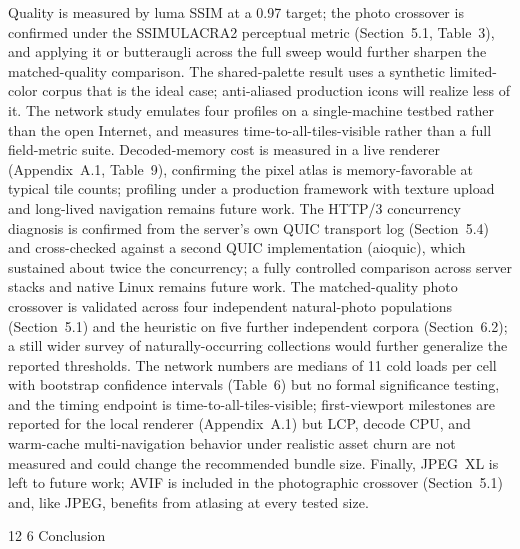 \documentclass[3p,twocolumn]{elsarticle}
\makeatletter
\renewcommand\section{\@startsection{section}{1}{\z@}%
           {12\p@ \@plus 3\p@ \@minus 4\p@}%
           {6\p@ \@plus 2\p@ \@minus 2\p@}%
           {\normalsize\bfseries\boldmath}}
\makeatother
\begin{document}
Quality is measured by luma SSIM at a 0.97 target; the photo crossover
is confirmed under the SSIMULACRA2 perceptual metric (Section~5.1,
Table~3), and applying it or butteraugli across the full sweep would
further sharpen the matched-quality comparison. The shared-palette
result uses a synthetic limited-color corpus that is the ideal case;
anti-aliased production icons will realize less of it. The network study
emulates four profiles on a single-machine testbed rather than the open
Internet, and measures time-to-all-tiles-visible rather than a full
field-metric suite. Decoded-memory cost is measured in a live renderer
(Appendix~A.1, Table~9), confirming the pixel atlas is memory-favorable
at typical tile counts; profiling under a production framework with
texture upload and long-lived navigation remains future work. The HTTP/3
concurrency diagnosis is confirmed from the server's own
QUIC transport log (Section~5.4) and cross-checked against a second QUIC
implementation (aioquic), which sustained about twice the concurrency; a
fully controlled comparison across server stacks and native Linux
remains future work. The matched-quality photo crossover is validated
across four independent natural-photo populations (Section~5.1) and the
heuristic on five further independent corpora (Section~6.2); a still
wider survey of naturally-occurring collections would further generalize
the reported thresholds. The network numbers are medians of 11 cold
loads per cell with bootstrap confidence intervals (Table~6) but no
formal significance testing, and the timing endpoint is
time-to-all-tiles-visible; first-viewport milestones are reported for
the local renderer (Appendix~A.1) but LCP, decode CPU, and warm-cache
multi-navigation behavior under realistic asset churn are not measured
and could change the recommended bundle size. Finally, JPEG~XL is left
to future work; AVIF is included in the photographic crossover
(Section~5.1) and, like JPEG, benefits from atlasing at every tested
size.

\section{Conclusion}
\end{document}
